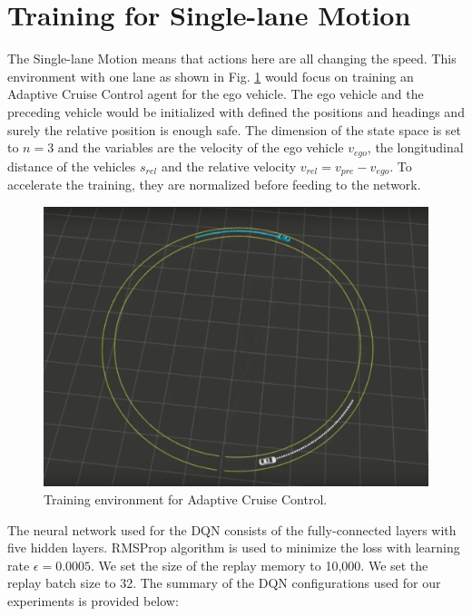 \section{Training for Single-lane Motion}

The Single-lane Motion means that actions here are all changing the speed. This environment with one lane as shown in Fig. \ref{fig:acc-env} would focus on training an Adaptive Cruise Control agent for the ego vehicle. The ego vehicle and the preceding vehicle would be initialized with defined the positions and headings and surely the relative position is enough safe. The dimension of the state space is set to $n = 3$ and the variables are the velocity of the ego vehicle $v_{ego}$, the longitudinal distance of the vehicles $s_{rel}$ and the relative velocity $v_{rel} = v_{pre} - v_{ego}$. To accelerate the training, they are normalized before feeding to the network.

\begin{figure}[h]
\centering
\includegraphics[width=1.0\textwidth]{figs/ch5/acc-env}
\caption{Training environment for Adaptive Cruise Control.}
\label{fig:acc-env}
\end{figure}

The neural network used for the DQN consists of the fully-connected layers with five hidden layers. RMSProp algorithm is used to minimize the loss with learning rate $\epsilon = 0.0005$. We set the size of the replay memory to 10,000. We set the replay batch size to 32. The summary of the DQN configurations used for our experiments is provided below:

